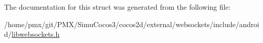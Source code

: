 The documentation for this struct was generated from the following file\+:\begin{DoxyCompactItemize}
\item 
/home/pmx/git/\+P\+M\+X/\+Simu\+Cocos3/cocos2d/external/websockets/include/android/\hyperlink{_2cocos2d_2external_2websockets_2include_2android_2libwebsockets_8h}{libwebsockets.\+h}\end{DoxyCompactItemize}
